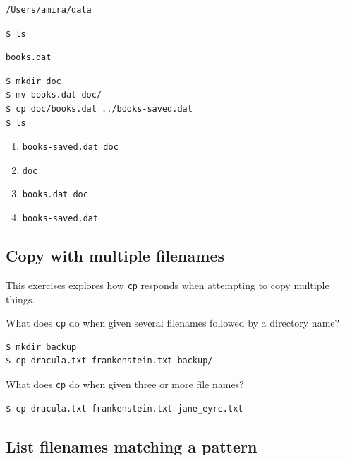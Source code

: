 \documentclass[
]{krantz}
\providecommand{\tightlist}{%
  \setlength{\itemsep}{0pt}\setlength{\parskip}{0pt}}
\begin{document}
\begin{verbatim}
/Users/amira/data
\end{verbatim}

\begin{verbatim}
$ ls
\end{verbatim}

\begin{verbatim}
books.dat
\end{verbatim}

\begin{verbatim}
$ mkdir doc
$ mv books.dat doc/
$ cp doc/books.dat ../books-saved.dat
$ ls
\end{verbatim}

\begin{enumerate}
\def\labelenumi{\arabic{enumi}.}
\tightlist
\item
  \texttt{books-saved.dat\ doc}
\item
  \texttt{doc}
\item
  \texttt{books.dat\ doc}
\item
  \texttt{books-saved.dat}
\end{enumerate}

\hypertarget{bash-basics-ex-copy-multi}{%
\subsection{Copy with multiple filenames}\label{bash-basics-ex-copy-multi}}

This exercises explores how \texttt{cp} responds when attempting to copy multiple things.

What does \texttt{cp} do when given several filenames followed by a directory name?

\begin{verbatim}
$ mkdir backup
$ cp dracula.txt frankenstein.txt backup/
\end{verbatim}

What does \texttt{cp} do when given three or more file names?

\begin{verbatim}
$ cp dracula.txt frankenstein.txt jane_eyre.txt
\end{verbatim}

\hypertarget{bash-basics-ex-ls-match}{%
\subsection{List filenames matching a pattern}\label{bash-basics-ex-ls-match}}
\end{document}
